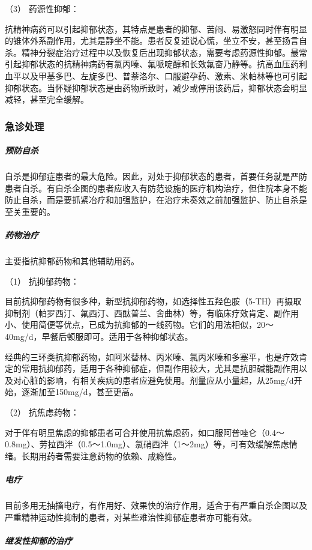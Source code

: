 \hypertarget{text00045.htmlux5cux23CHP1-18-3-2-4-3}{}
（3） 药源性抑郁：

抗精神病药可以引起抑郁状态，其特点是患者的抑郁、苦闷、易激怒同时伴有明显的锥体外系副作用，尤其是静坐不能。患者反复述说心慌，坐立不安，甚至扬言自杀。精神分裂症治疗过程中以及恢复后出现抑郁状态，需要考虑药源性抑郁。最常引起抑郁状态的抗精神病药有氯丙嗪、氟哌啶醇和长效氟奋乃静等。抗高血压药利血平以及甲基多巴、左旋多巴、普萘洛尔、口服避孕药、激素、米帕林等也可引起抑郁状态。当怀疑抑郁状态是由药物所致时，减少或停用该药后，抑郁状态会明显减轻，甚至完全缓解。

\subsubsection{急诊处理}

\subparagraph{预防自杀}

自杀是抑郁症患者的最大危险。因此，对处于抑郁状态的患者，首要任务就是严防患者自杀。有自杀企图的患者应收入有防范设施的医疗机构治疗，但住院本身不能防止自杀，而是要抓紧冶疗和加强监护，在治疗未奏效之前加强监护、防止自杀是至关重要的。

\subparagraph{药物治疗}

主要指抗抑郁药物和其他辅助用药。

\hypertarget{text00045.htmlux5cux23CHP1-18-3-3-2-1}{}
（1） 抗抑郁药物：

目前抗抑郁药物有很多种，新型抗抑郁药物，如选择性五羟色胺（5-TH）再摄取抑制剂（帕罗西汀、氟西汀、西酞普兰、舍曲林）等，有临床疗效肯定、副作用小、使用简便等优点，已成为抗抑郁的一线药物。它们的用法相似，20～40mg/d，早餐后顿服即可。适用于各种抑郁状态。

经典的三环类抗抑郁药物，如阿米替林、丙米嗪、氯丙米嗪和多塞平，也是疗效肯定的常用抗抑郁药，适用于各种抑郁症，但副作用较大，尤其是抗胆碱能副作用以及对心脏的影响，有相关疾病的患者应避免使用。剂量应从小量起，从25mg/d开始，逐渐加至150mg/d，甚至更高。

\hypertarget{text00045.htmlux5cux23CHP1-18-3-3-2-2}{}
（2） 抗焦虑药物：

对于伴有明显焦虑的抑郁患者可合并使用抗焦虑药，如口服阿普唑仑（0.4～0.8mg）、劳拉西泮（0.5～1.0mg）、氯硝西泮（1～2mg）等，可有效缓解焦虑情绪。长期用药者需要注意药物的依赖、成瘾性。

\subparagraph{电疗}

目前多用无抽搐电疗，有作用好、效果快的治疗作用，适合于有严重自杀企图以及严重精神运动性抑制的患者，对某些难治性抑郁症患者亦可能有效。

\subparagraph{继发性抑郁的治疗}

